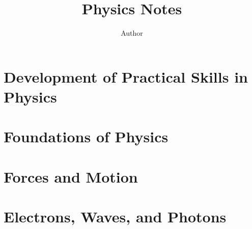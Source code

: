 \documentclass[11pt]{report}
\title{Physics Notes}
\author{Author}
\theoremstyle{definition}
\begin{document}
\maketitle

\tableofcontents

\chapter[Practical Skills]{Development of Practical Skills in Physics}


\chapter[Foundations of Physics]{Foundations of Physics}


\chapter[Forces and Motion]{Forces and Motion}


\chapter[Electrons, Waves, and Photons]{Electrons, Waves, and Photons}







\end{document}
